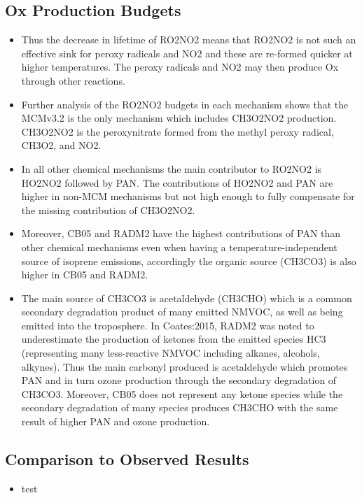 \documentclass[11pt,a4paper]{article}
\begin{document}
\subsection{Ox Production Budgets}
\begin{itemize}
    \item Thus the decrease in lifetime of RO2NO2 means that RO2NO2 is not such an effective sink for peroxy radicals and NO2 and these are re-formed quicker at higher temperatures. The peroxy radicals and NO2 may then produce Ox through other reactions.
    \item Further analysis of the RO2NO2 budgets in each mechanism shows that the MCMv3.2 is the only mechanism which includes CH3O2NO2 production. CH3O2NO2 is the peroxynitrate formed from the methyl peroxy radical, CH3O2, and NO2.  
    \item In all other chemical mechanisms the main contributor to RO2NO2 is HO2NO2 followed by PAN. The contributions of HO2NO2 and PAN are higher in non-MCM mechanisms but not high enough to fully compensate for the missing contribution of CH3O2NO2. 
    \item Moreover, CB05 and RADM2 have the highest contributions of PAN than other chemical mechanisms even when having a temperature-independent source of isoprene emissions, accordingly the organic source (CH3CO3) is also higher in CB05 and RADM2.
    \item The main source of CH3CO3 is acetaldehyde (CH3CHO) which is a common secondary degradation product of many emitted NMVOC, as well as being emitted into the troposphere. In Coates:2015, RADM2 was noted to underestimate the production of ketones from the emitted species HC3 (representing many less-reactive NMVOC including alkanes, alcohols, alkynes). Thus the main carbonyl produced is acetaldehyde which promotes PAN and in turn ozone production through the secondary degradation of CH3CO3. Moreover, CB05 does not represent any ketone species while the secondary degradation of many species produces CH3CHO with the same result of higher PAN and ozone production.
\end{itemize}

\subsection{Comparison to Observed Results}
\begin{itemize}
    \item test
\end{itemize}
\end{document}

